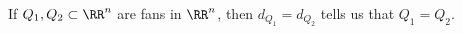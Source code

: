 

    If $Q_1, Q_2\subset \RR^n$ are fans in $\RR^n$, then $d_{Q_1}=d_{Q_2}$ tells us that $Q_1 = Q_2$. 

